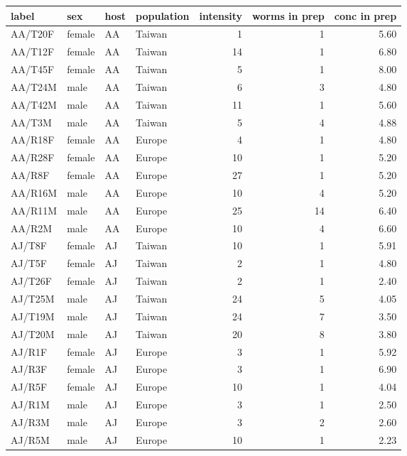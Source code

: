 \begin{table}[h]
\begin{center}
\begin{tabular}{llllrrr}
  \hline
label & sex & host & population & intensity & worms in prep & conc in prep \\ 
  \hline
AA/T20F & female & AA & Taiwan & 1 & 1 & 5.60 \\ 
  AA/T12F & female & AA & Taiwan & 14 & 1 & 6.80 \\ 
  AA/T45F & female & AA & Taiwan & 5 & 1 & 8.00 \\ 
  AA/T24M & male & AA & Taiwan & 6 & 3 & 4.80 \\ 
  AA/T42M & male & AA & Taiwan & 11 & 1 & 5.60 \\ 
  AA/T3M & male & AA & Taiwan & 5 & 4 & 4.88 \\ 
  AA/R18F & female & AA & Europe & 4 & 1 & 4.80 \\ 
  AA/R28F & female & AA & Europe & 10 & 1 & 5.20 \\ 
  AA/R8F & female & AA & Europe & 27 & 1 & 5.20 \\ 
  AA/R16M & male & AA & Europe & 10 & 4 & 5.20 \\ 
  AA/R11M & male & AA & Europe & 25 & 14 & 6.40 \\ 
  AA/R2M & male & AA & Europe & 10 & 4 & 6.60 \\ 
  AJ/T8F & female & AJ & Taiwan & 10 & 1 & 5.91 \\ 
  AJ/T5F & female & AJ & Taiwan & 2 & 1 & 4.80 \\ 
  AJ/T26F & female & AJ & Taiwan & 2 & 1 & 2.40 \\ 
  AJ/T25M & male & AJ & Taiwan & 24 & 5 & 4.05 \\ 
  AJ/T19M & male & AJ & Taiwan & 24 & 7 & 3.50 \\ 
  AJ/T20M & male & AJ & Taiwan & 20 & 8 & 3.80 \\ 
  AJ/R1F & female & AJ & Europe & 3 & 1 & 5.92 \\ 
  AJ/R3F & female & AJ & Europe & 3 & 1 & 6.90 \\ 
  AJ/R5F & female & AJ & Europe & 10 & 1 & 4.04 \\ 
  AJ/R1M & male & AJ & Europe & 3 & 1 & 2.50 \\ 
  AJ/R3M & male & AJ & Europe & 3 & 2 & 2.60 \\ 
  AJ/R5M & male & AJ & Europe & 10 & 1 & 2.23 \\ 
   \hline
\end{tabular}

\end{center}
\end{table}
